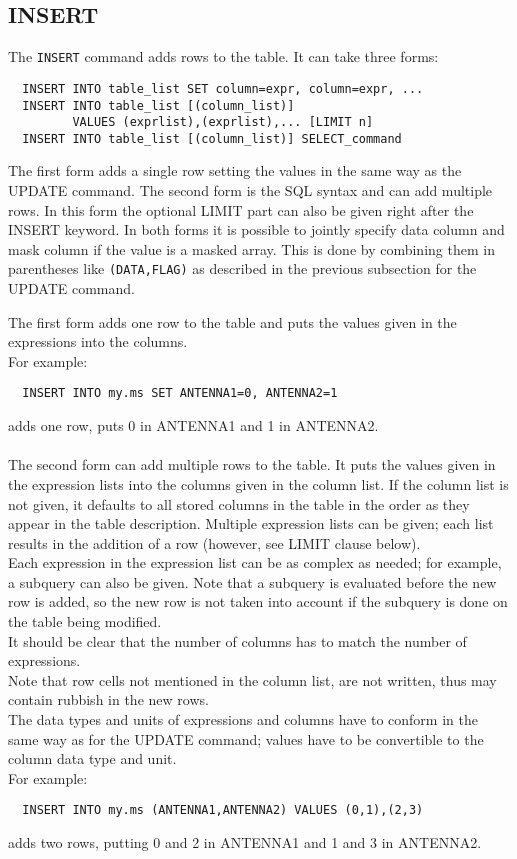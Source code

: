 \subsection{INSERT}
The \texttt{INSERT} command adds rows to the table. It can take three forms:
\begin{verbatim}
  INSERT INTO table_list SET column=expr, column=expr, ...
  INSERT INTO table_list [(column_list)]
         VALUES (exprlist),(exprlist),... [LIMIT n]
  INSERT INTO table_list [(column_list)] SELECT_command
\end{verbatim}
The first form adds a single row setting the values in the same way
as the UPDATE command. 
The second form is the SQL syntax and can add multiple rows. In this
form the optional LIMIT part can also be given right after the INSERT keyword.
In both forms it is possible to jointly specify
data column and mask column if the value is a masked array. This is
done by combining them in parentheses like {\tt (DATA,FLAG)} as
described in the previous subsection for the UPDATE command.

The first form adds one row to the table and puts the values given in
the expressions into the columns.
\\For example:
\begin{verbatim}
  INSERT INTO my.ms SET ANTENNA1=0, ANTENNA2=1
\end{verbatim}
adds one row, puts 0 in ANTENNA1 and 1 in ANTENNA2.

\paragraph*{}
The second form can add multiple rows to the table. It puts the values given in
the expression lists into the columns given in the column list.
If the column list is not given, it defaults to all stored columns in
the table in the order as they appear in the table description.
Multiple expression lists can be given; each list results in the
addition of a row (however, see LIMIT clause below).
\\Each expression in the expression list can be as complex as needed;
for example, a subquery can also be given. Note that a subquery is
evaluated before the new row is added, so the new row is not taken
into account if the subquery is done on the table being modified.
\\It should be clear that the number of columns has to match the
number of expressions.
\\Note that row cells not mentioned in the column list,
are not written, thus may contain rubbish in the new rows.
\\The data types and units of expressions and columns have to conform in
the same way 
as for the UPDATE command; values have to be convertible
to the column data type and unit.
\\For example:
\begin{verbatim}
  INSERT INTO my.ms (ANTENNA1,ANTENNA2) VALUES (0,1),(2,3)
\end{verbatim}
adds two rows, putting 0 and 2 in ANTENNA1 and 1 and 3 in ANTENNA2.

